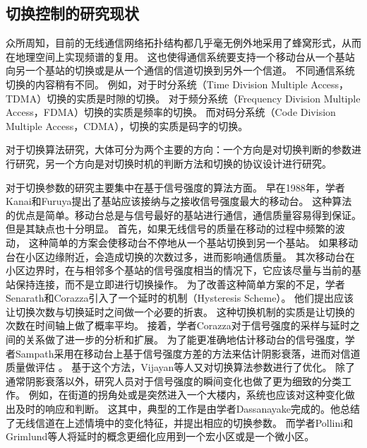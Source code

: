 \subsection{切换控制的研究现状}

\par 
众所周知，目前的无线通信网络拓扑结构都几乎毫无例外地采用了蜂窝形式，从而在地理空间上实现频谱的复用。
这也使得通信系统要支持一个移动台从一个基站向另一个基站的切换或是从一个通信的信道切换到另外一个信道。
不同通信系统切换的内容稍有不同。
例如，对于时分系统（Time Division Multiple Access，TDMA）切换的实质是时隙的切换。
对于频分系统（Frequency Division Multiple Access，FDMA）切换的实质是频率的切换。
而对码分系统（Code Division Multiple Access，CDMA），切换的实质是码字的切换。

对于切换算法研究，大体可分为两个主要的方向：一个方向是对切换判断的参数进行研究，另一个方向是对切换时机的判断方法和切换的协议设计进行研究。

对于切换参数的研究主要集中在基于信号强度的算法方面。
早在1988年，学者Kanai和Furuya提出了基站应该接纳与之接收信号强度最大的移动台\cite{Kanai1988}。
这种算法的优点是简单。移动台总是与信号最好的基站进行通信，通信质量容易得到保证。
但是其缺点也十分明显。
首先，如果无线信号的质量在移动的过程中频繁的波动，
这种简单的方案会使移动台不停地从一个基站切换到另一个基站。
如果移动台在小区边缘附近，会造成切换的次数过多，进而影响通信质量。
其次移动台在小区边界时，在与相邻多个基站的信号强度相当的情况下，它应该尽量与当前的基站保持连接，而不是立即进行切换操作。
为了改善这种简单方案的不足，学者Senarath和Corazza引入了一个延时的机制（Hysteresis Scheme）\cite{345338}。
他们提出应该让切换次数与切换延时之间做一个必要的折衷。
这种切换机制的实质是让切换的次数在时间轴上做了概率平均。
接着，学者Corazza对于信号强度的采样与延时之间的关系做了进一步的分析和扩展\cite{345424}。
为了能更准确地估计移动台的信号强度，学者Sampath采用在移动台上基于信号强度方差的方法来估计阴影衰落，进而对信道质量做评估 \cite{368926}。
基于这个方法，Vijayan等人又对切换算法参数进行了优化\cite{528368}。
除了通常阴影衰落以外，研究人员对于信号强度的瞬间变化也做了更为细致的分类工作。
例如，在街道的拐角处或是突然进入一个大楼内，系统也应该对这种变化做出及时的响应和判断\cite{350270}。
这其中，典型的工作是由学者Dassanayake完成的\cite{220848}。他总结了无线信道在上述情境中的变化特征，并提出相应的切换参数。
而学者Pollini和Grimlund等人将延时的概念更细化应用到一个宏小区或是一个微小区\cite{486807}\cite{140543}。


